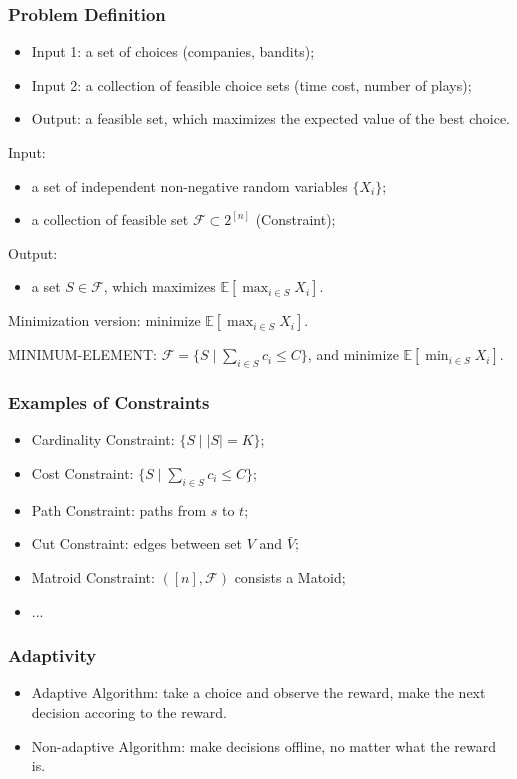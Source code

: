 \documentclass{beamer}
\newcommand{\calF}{{\mathcal F}}
\newcommand{\Exp}{{\mathbb{E}}}
\newcommand{\MM}{{\textsf{MAXIMUM-ELEMENT}}}
\newcommand{\mm}{{\textsf{MINIMUM-ELEMENT}}}
\begin{document}
\begin{frame}
\frametitle{Problem Definition}
    \begin{itemize}
    \item Input 1: a set of choices (companies, bandits);
	\item Input 2: a collection of feasible choice sets (time cost, number of plays);
	\item Output: a feasible set, which maximizes the expected value of the best choice.
	\end{itemize}
\begin{problem}[$\MM$]
Input:
\begin{itemize}
\item a set of independent non-negative random variables $\{X_i\}$;
\item a collection of feasible set $\calF \subset 2^{[n]}$ (Constraint);
\end{itemize}
Output:
\begin{itemize}
\item a set $S\in \calF$, which maximizes $\Exp[\max_{i\in S} X_i]$.
\end{itemize}
\end{problem}

Minimization version: minimize $\Exp[\max_{i\in S} X_i]$.

\mm: $\calF = \{S \mid \sum_{i\in S} c_i \leq C\}$, and minimize $\Exp[\min_{i\in S} X_i]$.
\end{frame}

\begin{frame}
\frametitle{Examples of Constraints}
\begin{itemize}
\item Cardinality Constraint: $\{S \mid |S| = K\}$;
\item Cost Constraint: $\{S \mid \sum_{i\in S} c_i \leq C\}$;
\item Path Constraint: paths from $s$ to $t$;
\item Cut Constraint: edges between set $V$ and $\bar V$;
\item Matroid Constraint: $([n], \calF)$ consists a Matoid;
\item ...
\end{itemize}
\end{frame}

\begin{frame}
    \frametitle{Adaptivity}
    \begin{itemize}
        \item Adaptive Algorithm: take a choice and observe the reward, make the next decision accoring to the reward.
        \item Non-adaptive Algorithm: make decisions offline, no matter what the reward is.
    \end{itemize}
\end{frame}
\end{document}
